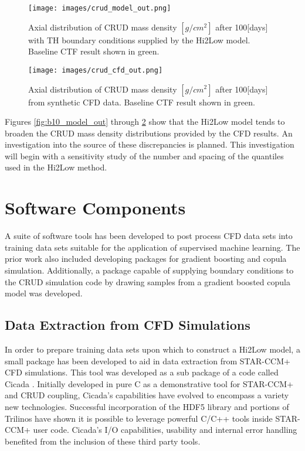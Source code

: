 \begin{figure}[hbtp]
\centering
\texttt{[image: images/crud\_model\_out.png]}
\caption{Axial distribution of CRUD mass density $[g/cm^2]$ after 100[days] with TH boundary conditions supplied by the Hi2Low model. Baseline CTF result shown in green.}
\label{fig:crud_model_out}
\end{figure}

\begin{figure}[hbtp]
\centering
\texttt{[image: images/crud\_cfd\_out.png]}
\caption{Axial distribution of CRUD mass density $[g/cm^2]$ after 100[days] from synthetic CFD data. Baseline CTF result shown in green.}
\label{fig:crud_cfd_out}
\end{figure}

Figures \ref{fig:b10_model_out} through \ref{fig:crud_cfd_out} show that the Hi2Low model tends to broaden the CRUD mass density distributions provided by the CFD results.  An investigation into the source of these discrepancies is planned.  This investigation will begin with a sensitivity study of the number and spacing of the quantiles used in the Hi2Low method.

\section{Software Components}

A suite of software tools has been developed to post process CFD data sets into training data sets suitable for the application of supervised machine learning.   The prior work also included developing packages for gradient boosting and copula simulation.  Additionally, a package capable of supplying boundary conditions to the CRUD simulation code by drawing samples from a gradient boosted copula model was developed.

\subsection{Data Extraction from CFD Simulations}

In order to prepare training data sets upon which to construct a Hi2Low model, a small package has been developed to aid in data extraction from STAR-CCM+ CFD simulations.  This tool was developed as a sub package of a code called Cicada \cite{slattery16}. Initially developed in pure C as a demonstrative tool for STAR-CCM+ and CRUD coupling, Cicada's capabilities have evolved to encompass a variety new technologies.  Successful incorporation of the HDF5 library and portions of Trilinos have shown it is possible to leverage powerful C/C++ tools inside STAR-CCM+ user code.  Cicada's I/O capabilities, usability and internal error handling benefited from the inclusion of these third party tools.

